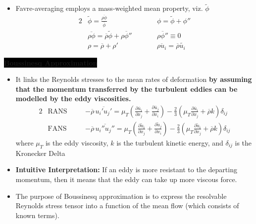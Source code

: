 \begin{itemize}
    \begin{itemize}
        \item Favre-averaging employs a mass-weighted mean property, viz. $\widetilde{\phi}$
        \begin{alignat*}{2}
            &\widetilde{\phi} = \frac{\overline{\rho \phi}}{\overline{\phi}} \qquad && \phi = \widetilde{\phi} + \phi ''\\
            &\overline{\rho \phi} = \overline{\rho}\widetilde{\phi} + \overline{\rho \phi ''} \qquad && \overline{\rho \phi '' } \equiv 0 \\
            &\rho = \overline{\rho} +\rho ' \qquad && \overline{\rho u_i } = \overline{\rho} \widetilde{u_i}
        \end{alignat*}
    \end{itemize}
\end{itemize}

\colorbox{black}{\textbf{\color{white}Boussinesq Approximation}}
\begin{itemize}
    \item It links the Reynolds stresses to the mean rates of deformation \textbf{\color{red}by assuming that the momentum transferred by the turbulent eddies can be modelled by the eddy viscosities.}
    \begin{alignat*}{2}
        &\text{RANS} \quad && - \overline{\rho} \, \overline{u_i ' u_j '} = \mu_T \left(\frac{\partial \overline{u}_i}{\partial x_j} + \frac{\partial \overline{u}_j}{\partial x_i}\right) - \frac{2}{3} \left(\mu_T \frac{\partial \overline{u}_i}{\partial x_j} + \overline{\rho} k\right)\delta_{ij} \\
        &\text{FANS} \quad && - \overline{\rho} \, \overline{u_i '' u_j ''} = \mu_T \left(\frac{\partial \widetilde{u}_i}{\partial x_j} + \frac{\partial \widetilde{u}_j}{\partial x_i}\right) - \frac{2}{3} \left(\mu_T \frac{\partial \widetilde{u}_i}{\partial x_j} + \overline{\rho} k\right)\delta_{ij} 
    \end{alignat*}
    where $\mu_T$ is the eddy viscosity, $k$ is the turbulent kinetic energy, and $\delta_{ij}$ is the Kronecker Delta
    \item \textbf{\color{orange}Intuitive Interpretation:} If an eddy is more resistant to the departing momentum, then it means that the eddy can take up more viscous force.
    \item The purpose of Boussinesq approximation is to express the resolvable Reynolds stress tensor into a function of the mean flow (which consists of known terms).
\end{itemize}